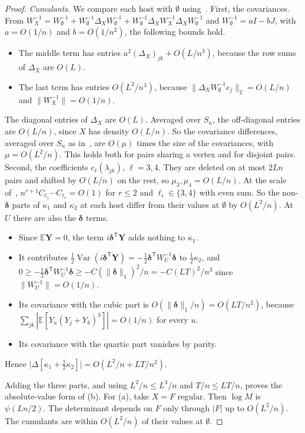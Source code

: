 \documentclass[11pt]{article}
\newcommand{\EE}{\mathbb{E}}
\begin{document}
\begin{proof}
\emph{Cumulants.}
We compare each host with \(\emptyset\) using~\cite[Theorem~2.5]{IM25}.
First, the covariances. From
\(W_X^{-1}=W_\emptyset^{-1}+W_\emptyset^{-1}\varDelta_XW_\emptyset^{-1}
+W_\emptyset^{-1}\varDelta_XW_X^{-1}\varDelta_XW_\emptyset^{-1}\) and
\(W_\emptyset^{-1}=aI-bJ\), with \(a=O(1/n)\) and \(b=O(1/n^2)\), the following
bounds hold.
\begin{itemize}
\item The middle term has entries \(a^2(\varDelta_X)_{jk}+O(L/n^3)\), because the row sums of
\(\varDelta_X\) are \(O(L)\).
\item The last term has entries \(O(L^2/n^3)\), because
\(\|\varDelta_XW_\emptyset^{-1}e_j\|_2=O(L/n)\) and \(\|W_X^{-1}\|=O(1/n)\).
\end{itemize}
The diagonal entries of \(\varDelta_X\) are \(O(L)\).
Averaged over \(S_n\), the off-diagonal entries are
\(O(L/n)\), since \(X\) has density \(O(L/n)\).
So the covariance differences, averaged over \(S_n\) as
in~\cite[Theorem~2.5]{IM25}, are \(O(\mu)\) times the size of the covariances, with
\(\mu=O(L^2/n)\).
This holds both for pairs sharing a vertex and for disjoint pairs.
Second, the coefficients \(c_\ell(\lambda_{jk})\), \(\ell=3,4\). They are
deleted on at most \(2Ln\) pairs and shifted by \(O(L/n)\) on the rest, so
\(\mu_3,\mu_4=O(L/n)\).
At the scale of~\cite[Theorem~2.4]{IM25}, \(n^{r+1}C_{\ell_1}\cdots C_{\ell_r}=O(1)\)
for \(r\le2\) and \(\ell_i\in\{3,4\}\) with even sum.
So the non-\(\boldsymbol\delta\) parts of \(\kappa_1\) and \(\kappa_2\) at each host differ
from their values at \(\emptyset\) by \(O(L^2/n)\).
At \(U\) there are also the \(\boldsymbol\delta\) terms.
\begin{itemize}
\item Since \(\EE\boldsymbol Y=0\), the term \(i\boldsymbol\delta^{\mathsf T}\boldsymbol Y\) adds nothing to \(\kappa_1\).
\item It contributes
\(\frac12\operatorname{Var}(i\boldsymbol\delta^{\mathsf T}\boldsymbol Y)
=-\frac12\boldsymbol\delta^{\mathsf T}W_U^{-1}\boldsymbol\delta\) to \(\frac12\kappa_2\),
and \(0\ge-\tfrac12\boldsymbol\delta^{\mathsf T}W_U^{-1}\boldsymbol\delta
\ge -C(\|\boldsymbol\delta\|_1)^2/n=-C(LT)^2/n^3\) since
\(\|W_U^{-1}\|=O(1/n)\).
\item Its covariance with the cubic part is \(O(\|\boldsymbol\delta\|_1/n)=O(LT/n^2)\),
because \(\sum_{jk}|\EE[Y_u(Y_j+Y_k)^3]|=O(1/n)\) for every \(u\).
\item Its covariance with the quartic part vanishes by parity.
\end{itemize}
Hence \(\bigl|\Delta[\kappa_1+\frac12\kappa_2]\bigr|=O(L^2/n+LT/n^2)\).

Adding the three parts, and using \(L^2/n\le L^3/n\) and \(T/n\le LT/n\),
proves the absolute-value form of (b).
For (a), take \(X=F\) regular. Then \(\log M\) is \(\psi(Ln/2)\). The
determinant depends on \(F\) only through \(|F|\) up to \(O(L^2/n)\). The
cumulants are within \(O(L^2/n)\) of their values at \(\emptyset\).
\end{proof}
\end{document}
